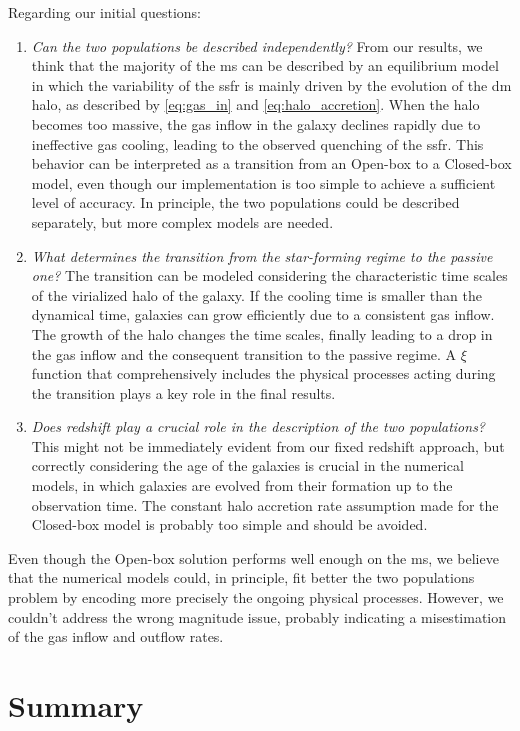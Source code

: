 \documentclass[fleqn, usenatbib]{mnras}
\begin{document}
Regarding our initial questions:
\begin{enumerate}
	\item \textit{Can the two populations be described independently?} From our results, we think that the majority of the \acrshort{ms} can be described by an equilibrium model in which the variability of the \acrshort{ssfr} is mainly driven by the evolution of the \acrshort{dm} halo, as described by \eqref{eq:gas_in} and \eqref{eq:halo_accretion}. When the halo becomes too massive, the gas inflow in the galaxy declines rapidly due to ineffective gas cooling, leading to the observed quenching of the \acrshort{ssfr}. This behavior can be interpreted as a transition from an Open-box to a Closed-box model, even though our implementation is too simple to achieve a sufficient level of accuracy. In principle, the two populations could be described separately, but more complex models are needed.
	\item \textit{What determines the transition from the star-forming regime to the passive one?} The transition can be modeled considering the characteristic time scales of the virialized halo of the galaxy. If the cooling time is smaller than the dynamical time, galaxies can grow efficiently due to a consistent gas inflow. The growth of the halo changes the time scales, finally leading to a drop in the gas inflow and the consequent transition to the passive regime. A \(\xi\) function that comprehensively includes the physical processes acting during the transition plays a key role in the final results.
	\item \textit{Does redshift play a crucial role in the description of the two populations?} This might not be immediately evident from our fixed redshift approach, but correctly considering the age of the galaxies is crucial in the numerical models, in which galaxies are evolved from their formation up to the observation time. The constant halo accretion rate assumption made for the Closed-box model is probably too simple and should be avoided.
\end{enumerate}

Even though the Open-box solution performs well enough on the \acrshort{ms}, we believe that the numerical models could, in principle, fit better the two populations problem by encoding more precisely the ongoing physical processes. However, we couldn't address the wrong magnitude issue, probably indicating a misestimation of the gas inflow and outflow rates.

\section{Summary}
\end{document}

